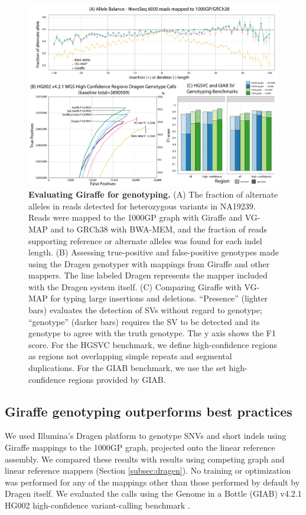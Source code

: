 \documentclass[11pt]{ucscthesis}
\begin{document}
\begin{figure}
    \centering
    \includegraphics[width=\linewidth]{aim2_fig4.pdf}
    \caption[Evaluating Giraffe for genotyping]{\textbf{Evaluating Giraffe for genotyping.} (A) The fraction of alternate alleles in reads detected for heterozygous variants in NA19239. Reads were mapped to the 1000GP graph with Giraffe and VG-MAP and to GRCh38 with BWA-MEM, and the fraction of reads supporting reference or alternate alleles was found for each indel length. (B) Assessing true-positive and false-positive genotypes made using the Dragen genotyper with mappings from Giraffe and other mappers. The line labeled Dragen represents the mapper included with the Dragen system itself. (C) Comparing Giraffe with VG-MAP for typing large insertions and deletions. “Presence” (lighter bars) evaluates the detection of SVs without regard to genotype; “genotype” (darker bars) requires the SV to be detected and its genotype to agree with the truth genotype. The y axis shows the F1 score. For the HGSVC benchmark, we define high-confidence regions as regions not overlapping simple repeats and segmental duplications. For the GIAB benchmark, we use the set high-confidence regions provided by GIAB.}
    \label{fig:aim2_fig4}
\end{figure}

\subsection{Giraffe genotyping outperforms best practices}
We used Illumina’s Dragen platform \cite{illumina_dragen_2019} to genotype SNVs and short indels using Giraffe mappings to the 1000GP graph, projected onto the linear reference assembly.
We compared these results with results using competing graph and linear reference mappers (Section \ref{subsec:dragen}).
No training or optimization was performed for any of the mappings other than those performed by default by Dragen itself. We evaluated the calls using the Genome in a Bottle (GIAB) v4.2.1 HG002 high-confidence variant-calling benchmark \cite{wagner_benchmarking_2020}.
\end{document}
